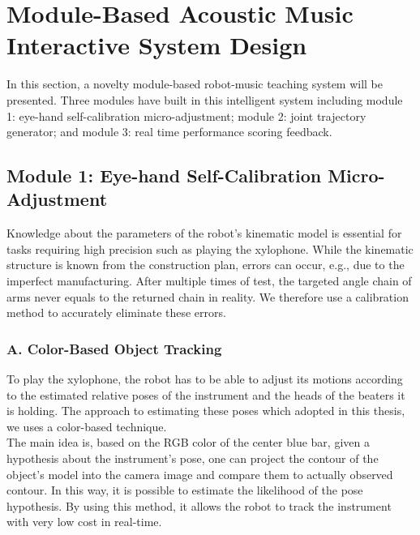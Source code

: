 \section{Module-Based Acoustic Music Interactive System Design}
In this section, a novelty module-based robot-music teaching system will be presented. 
Three modules have built in this intelligent system including module 1: eye-hand 
self-calibration micro-adjustment; module 2: joint trajectory generator; and 
module 3: real time performance scoring feedback. \\

\subsection{Module 1: Eye-hand Self-Calibration Micro-Adjustment}
Knowledge about the parameters of the robot's kinematic model is essential for 
tasks requiring high precision such as playing the xylophone. While the kinematic 
structure is known from the construction plan, errors can occur, e.g., due to the 
imperfect manufacturing. After multiple times of test, the targeted angle chain 
of arms never equals to the returned chain in reality. We therefore use a 
calibration method to accurately eliminate these errors.\\
 

\subsubsection{A. Color-Based Object Tracking}
To play the xylophone, the robot has to be able to adjust its motions according to
the estimated relative poses of the instrument and the heads of the beaters it is 
holding. The approach to estimating these poses which adopted in this thesis, we 
uses a color-based technique.\\
The main idea is, based on the RGB color of the center blue bar, given a hypothesis 
about the instrument's pose, one can project the contour of the object's model into the 
camera image and compare them to actually observed contour. In this way, it is possible 
to estimate the likelihood of the pose hypothesis. By using this method, it allows
the robot to track the instrument with very low cost in real-time.\\

